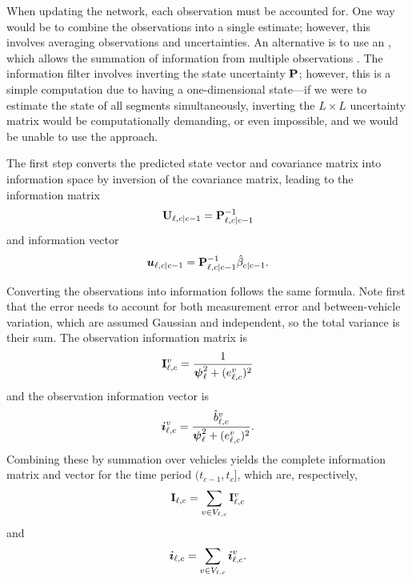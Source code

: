 When updating the network, each observation must be accounted for. One way would be to combine the observations into a single estimate; however, this involves averaging observations and uncertainties. An alternative is to use an \emph{\infil{}}, which allows the summation of information from multiple observations \citep{Mutambara_2000}. The information filter involves inverting the state uncertainty $\mathbf{P}$; however, this is a simple computation due to having a one-dimensional state---if we were to estimate the state of all segments simultaneously, inverting the $L\times L$ uncertainty matrix would be computationally demanding, or even impossible, and we would be unable to use the approach.



The first step converts the predicted state vector and covariance matrix into information space by inversion of the covariance matrix, leading to the information matrix
\begin{equation}\label{eq:nw_if_inf_matrix}
\mathbf{U}_{\ell,c|c-1} = \mathbf{P}_{\ell,c|c-1}^{-1}
\end{equation}
and information vector
\begin{equation}\label{eq:nw_if_inf_vector}
\boldsymbol{u}_{\ell,c|c-1} = \mathbf{P}_{\ell,c|c-1}^{-1} \hat{\beta}_{c|c-1}.
\end{equation}


Converting the observations into information follows the same formula. Note first that the error needs to account for both measurement error and between-vehicle variation, which are assumed Gaussian and independent, so the total variance is their sum. The observation information matrix is
\begin{equation}\label{eq:nw_if_inf_obsmatrix}
\mathbf{I}_{\ell,c}^v = \frac{1}{\mathbf{\boldsymbol{\psi}}_{\ell}^2 + (e_{\ell,c}^v)^2}
\end{equation}
and the observation information vector is
\begin{equation}\label{eq:nw_if_inf_obsvector}
\boldsymbol{i}_{\ell,c}^v = \frac{\hat{b}_{\ell,c}^v}{
    \mathbf{\boldsymbol{\psi}}_{\ell}^2 + (e_{\ell,c}^v)^2
}.
\end{equation}
Combining these by summation over vehicles yields the complete information matrix and vector for the time period $(t_{c-1},t_c]$, which are, respectively,
\begin{equation}\label{eq:nw_if_obsupdate_matrix}
\mathbf{I}_{\ell,c} = \sum_{v\in V_{\ell,c}} \mathbf{I}_{\ell,c}^v
\end{equation}
and
\begin{equation}\label{eq:nw_if_obsupdate_vector}
\boldsymbol{i}_{\ell,c} = \sum_{v \in V_{\ell,c}} \boldsymbol{i}_{\ell,c}^v.
\end{equation}



